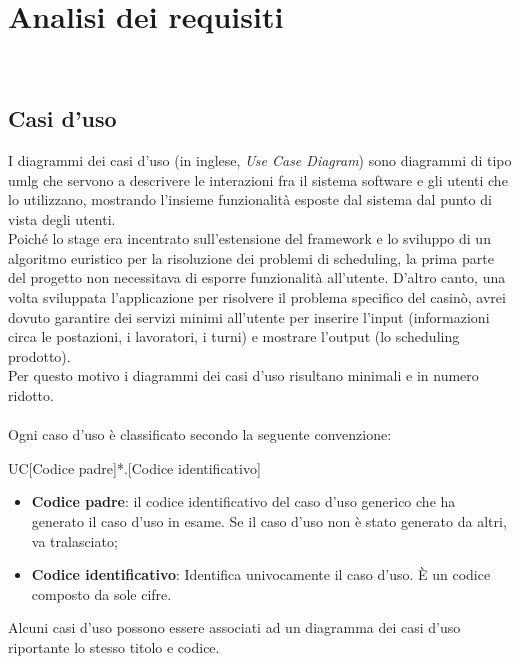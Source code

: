 
\chapter{Analisi dei requisiti}
\label{cap:analisi-requisiti}

\\

\section{Casi d'uso}
I diagrammi dei casi d'uso (in inglese, \textit{Use Case Diagram}) sono diagrammi di tipo \gls{umlg} che servono a descrivere le interazioni fra il sistema software e gli utenti che lo utilizzano, mostrando l'insieme funzionalità esposte dal sistema dal punto di vista degli utenti. \\
Poiché lo stage era incentrato sull'estensione del framework e lo sviluppo di un algoritmo euristico per la risoluzione dei problemi di scheduling, la prima parte del progetto non necessitava di esporre funzionalità all'utente. D'altro canto, una volta sviluppata l'applicazione per risolvere il problema specifico del casinò, avrei dovuto garantire dei servizi minimi all'utente per inserire l'input (informazioni circa le postazioni, i lavoratori, i turni) e mostrare l'output (lo scheduling prodotto). \\
Per questo motivo i diagrammi dei casi d'uso risultano minimali e in numero ridotto.\\
\\
Ogni caso d'uso è classificato secondo la seguente convenzione:
\begin{center}
    UC[Codice padre]*.[Codice identificativo]
\end{center}

\begin{itemize}
    \item \textbf{Codice padre}: \MakeUppercase{} il codice identificativo del caso d'uso generico che ha generato il caso d'uso in esame. Se il caso d'uso non è stato generato da altri, va tralasciato;
    \item \textbf{Codice identificativo}: Identifica univocamente il caso d'uso. \MakeUppercase{è} un codice composto da sole cifre. 
\end{itemize}
\noindent
Alcuni casi d'uso possono essere associati ad un diagramma dei casi d'uso riportante lo stesso titolo e codice.
\clearpage

